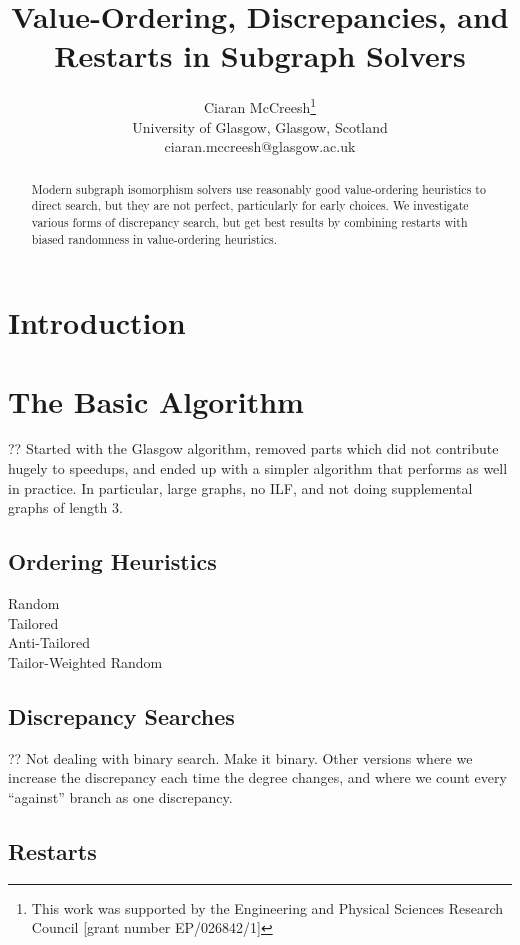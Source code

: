 \documentclass{article}
\title{Value-Ordering, Discrepancies, and Restarts in Subgraph Solvers}
\author{Ciaran McCreesh\thanks{This work was supported by the Engineering and Physical Sciences
    Research Council [grant number EP/026842/1]}\\ University of Glasgow, Glasgow, Scotland \\
    ciaran.mccreesh@glasgow.ac.uk}
\begin{document}
\maketitle

\begin{abstract}
    Modern subgraph isomorphism solvers use reasonably good value-ordering heuristics to direct
    search, but they are not perfect, particularly for early choices. We investigate various forms
    of discrepancy search, but get best results by combining restarts with biased randomness in
    value-ordering heuristics.
\end{abstract}

\section{Introduction}

\section{The Basic Algorithm}

?? Started with the Glasgow algorithm, removed parts which did not contribute hugely to speedups,
and ended up with a simpler algorithm that performs as well in practice. In particular, large
graphs, no ILF, and not doing supplemental graphs of length 3.

\subsection{Ordering Heuristics}

\begin{description}
    \item[Random]
    \item[Tailored]
    \item[Anti-Tailored]
    \item[Tailor-Weighted Random]
\end{description}

\subsection{Discrepancy Searches}

?? Not dealing with binary search. Make it binary. Other versions where we increase the discrepancy
each time the degree changes, and where we count every ``against'' branch as one discrepancy.

\subsection{Restarts}
\end{document}
